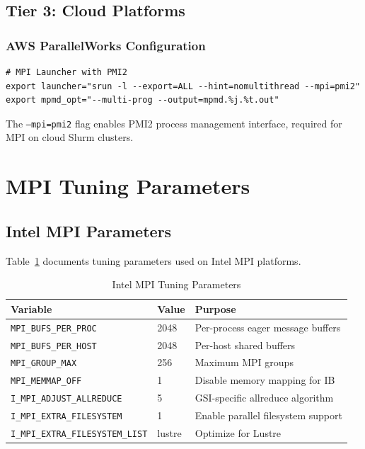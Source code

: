 \documentclass[11pt,a4paper,twoside]{article}
\begin{document}
\subsection{Tier 3: Cloud Platforms}

\subsubsection{AWS ParallelWorks Configuration}

\begin{lstlisting}[style=bashstyle,caption={AWS ParallelWorks Configuration (env/AWSPW.env)},label={lst:aws}]
# MPI Launcher with PMI2
export launcher="srun -l --export=ALL --hint=nomultithread --mpi=pmi2"
export mpmd_opt="--multi-prog --output=mpmd.%j.%t.out"
\end{lstlisting}

The \texttt{--mpi=pmi2} flag enables PMI2 process management interface, required for MPI on cloud Slurm clusters.

\section{MPI Tuning Parameters}
\label{sec:tuning}

\subsection{Intel MPI Parameters}

Table~\ref{tab:intelmpi} documents tuning parameters used on Intel MPI platforms.

\begin{table}[H]
\centering
\caption{Intel MPI Tuning Parameters}
\label{tab:intelmpi}
\begin{tabular}{@{}llp{6cm}@{}}
\toprule
\textbf{Variable} & \textbf{Value} & \textbf{Purpose} \\
\midrule
\texttt{MPI\_BUFS\_PER\_PROC} & 2048 & Per-process eager message buffers \\
\texttt{MPI\_BUFS\_PER\_HOST} & 2048 & Per-host shared buffers \\
\texttt{MPI\_GROUP\_MAX} & 256 & Maximum MPI groups \\
\texttt{MPI\_MEMMAP\_OFF} & 1 & Disable memory mapping for IB \\
\texttt{I\_MPI\_ADJUST\_ALLREDUCE} & 5 & GSI-specific allreduce algorithm \\
\texttt{I\_MPI\_EXTRA\_FILESYSTEM} & 1 & Enable parallel filesystem support \\
\texttt{I\_MPI\_EXTRA\_FILESYSTEM\_LIST} & lustre & Optimize for Lustre \\
\bottomrule
\end{tabular}
\end{table}
\end{document}
